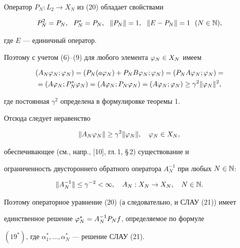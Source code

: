 \begin{pf}


Оператор $P_N:L_2\to X_N$ из (20) обладает свойствами


\begin{equation}


P_N^2 = P_N,\ \ P_N^* = P_N,\ \ \|P_N\|=1,\ \ \|E - P_N\|=1\ \ (N\in\N),


\end{equation}


где $E$ --- единичный оператор.


Поэтому с учетом (6)--(9) для любого элемента $\varphi_N\in X_N$ имеем


\begin{multline}


(A_N\vp_N;\vp_N) = (P_N(a\vp_N)+P_NB\vp_N;\vp_N) =


(P_NA\vp_N;\vp_N)= \\


%


=(A\vp_N;P_N^*\vp_N)=(A\vp_N;P_N\vp_N) = (A\vp_N;\vp_N)\gea \gamma^2\|\vp_N\|^2,


\end{multline}


где постоянная $\gamma^2$ определена в формулировке теоремы 1. 


Отсюда следует неравенство


\begin{equation}


\|A_N\vp_N\| \gea \gamma^2\|\vp_N\|,\quad \vp_N\in X_N,


\end{equation}


обеспечивающее (см., напр., [10], гл.\,1, \S\,2) существование и 


ограниченность двустороннего обратного оператора $A_N^{-1}$ при любых $N\in\Bbb {N}$:


\begin{equation}


\|A_N^{-1}\|\lea \gamma^{-2}<\infty,\quad A_N:X_N\to X_N,\quad N\in\N.


\end{equation}


Поэтому операторное уравнение (20) (а следовательно, и СЛАУ (21)) имеет 


единственное решение $\varphi_N^* = A_N^{-1}P_N f$, определяемое по формуле 


$(19^*)$, где $\alpha^*_1, \dotsc,\alpha_N^*$ --- решение СЛАУ (21).






\end{pf}

